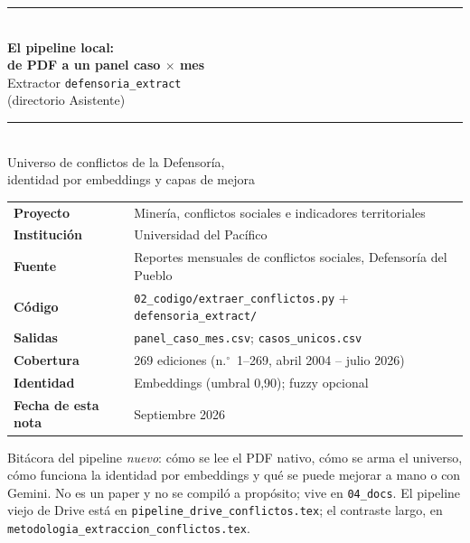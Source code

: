 \documentclass[11pt,a4paper]{article}
\begin{document}
\begin{titlepage}
\centering
\vspace*{1.4cm}
{\color{upnavy}\rule{\textwidth}{1.4pt}}\\[0.7em]
{\LARGE\bfseries\color{upnavy} El pipeline local:}\\[0.35em]
{\LARGE\bfseries\color{upnavy} de PDF a un panel caso $\times$ mes}\\[0.7em]
{\Large Extractor \texttt{defensoria\_extract}\\[0.2em]
(directorio Asistente)}\\[0.7em]
{\color{upnavy}\rule{\textwidth}{1.4pt}}\\[1.3em]
{\large Universo de conflictos de la Defensoría,\\[0.2em]
identidad por embeddings y capas de mejora}\\[2em]

\begin{flushleft}
\renewcommand{\arraystretch}{1.35}
\begin{tabular}{@{}l@{\hspace{1.2em}}l@{}}
\textbf{Proyecto} & Minería, conflictos sociales e indicadores territoriales \\
\textbf{Institución} & Universidad del Pacífico \\
\textbf{Fuente} & Reportes mensuales de conflictos sociales, Defensoría del Pueblo \\
\textbf{Código} & \texttt{02\_codigo/extraer\_conflictos.py} + \texttt{defensoria\_extract/} \\
\textbf{Salidas} & \texttt{panel\_caso\_mes.csv}; \texttt{casos\_unicos.csv} \\
\textbf{Cobertura} & 269 ediciones (n.$^\circ$~1--269, abril 2004 -- julio 2026) \\
\textbf{Identidad} & Embeddings (umbral 0{,}90); fuzzy opcional \\
\textbf{Fecha de esta nota} & Septiembre 2026 \\
\end{tabular}
\end{flushleft}

\vfill
\begin{flushleft}
\color{upgray}\small
Bitácora del pipeline \emph{nuevo}: cómo se lee el PDF nativo, cómo se arma el universo, cómo funciona la identidad por embeddings y qué se puede mejorar a mano o con Gemini. No es un paper y no se compiló a propósito; vive en \texttt{04\_docs}. El pipeline viejo de Drive está en \texttt{pipeline\_drive\_conflictos.tex}; el contraste largo, en \texttt{metodologia\_extraccion\_conflictos.tex}.
\end{flushleft}
\end{titlepage}
\end{document}
